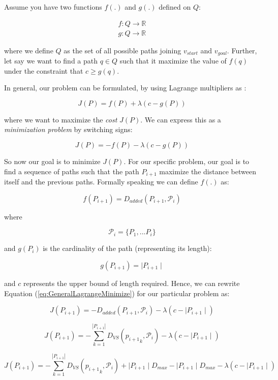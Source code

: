 \documentclass[graybox]{svmult}
\newcommand{\PathSet}{\ensuremath{\mathcal P} }
\newcommand{\Path}{\ensuremath{P} }
\newcommand{\VertexSetDistance}{\ensuremath{D_{VS}} }
\newcommand{\AddedDistance}{\ensuremath{D_{added}} }
\newcommand{\Dmax}{\ensuremath{D_{max}} }
\begin{document}
Assume you have two functions $f(.)$ and $g(.)$ defined on $Q$:

\[ \begin{array}{l}
	f: Q \rightarrow \mathbb{R} \\
	g: Q \rightarrow \mathbb{R}
	\end{array}
\]	

where we define $Q$ as the set of all possible paths joining $v_{start}$ and $v_{goal}$. Further, let say we want to find a path $q \in Q$ such that it maximize the value of $f(q)$ under the constraint that $c \geq g(q)$.
\smallskip

In general, our problem can be formulated, by using Lagrange multipliers as :

\[ J(\Path) = f(\Path) + \lambda (c - g(\Path) ) \]


where we want to maximize the \emph{cost} $J(\Path)$. We can express this as a \emph{minimization problem} by switching signs:

\begin{equation} 
J(\Path) = -f(\Path) - \lambda(c - g(\Path)) 
\label{eq:GeneralLagrangeMinimize}
\end{equation}

So now our goal is to minimize $J(\Path)$. For our specific problem, our goal is to find a sequence of paths such that the path $\Path_{i+1}$ maximize the distance between itself and the previous paths. Formally speaking we can define $f(.)$ as:

\[ f(\Path_{i+1}) =  \AddedDistance ( \Path_{i+1}, \PathSet_{i} ) \]

where

\[ \PathSet_{i} = \{ \Path _{1},...\Path _{i} \} \]

and $g(\Path_{i})$ is the cardinality of the path (representing its length):

\[ g(\Path_{i+1}) = \mid \Path_{i+1} \mid \]

and $c$ represents the upper bound of length required. Hence, we can rewrite Equation (\ref{eq:GeneralLagrangeMinimize}) for our particular problem as:

\[ J(\Path_{i+1}) = -\AddedDistance ( \Path_{i+1}, \PathSet_{i} ) - \lambda(c - \mid \Path_{i+1} \mid ) \]

\[ J(\Path_{i+1}) = - \sum _{k = 1}^{|\Path_{i+1}|} \VertexSetDistance({p_{i+1}}_{k}, \PathSet_{i})  - \lambda(c - \mid \Path_{i+1} \mid ) \]

\[ J(\Path_{i+1}) = - \sum _{k = 1}^{|\Path_{i+1}|} \VertexSetDistance({p_{i+1}}_{k}, \PathSet_{i}) + \mid \Path_{i+1} \mid \Dmax -\mid \Path_{i+1} \mid \Dmax   - \lambda(c - \mid \Path_{i+1} \mid ) \]
\end{document}
